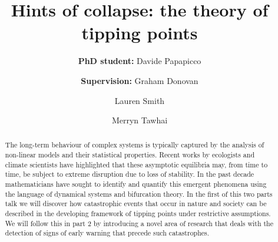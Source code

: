 \documentclass[dvipsnames, table, 11pt]{article}
\begin{document}
     \title{Hints of collapse: the theory of tipping points}

     \author[*]{\textbf{PhD student:} Davide Papapicco}
     \author[*]{\authorcr \textbf{Supervision:} Graham Donovan}
     \author[*]{Lauren Smith}
     \author[$\dagger$]{Merryn Tawhai}

 
     \date{}

     \maketitle

     \begin{abstract}
             The long-term behaviour of complex systems is typically captured by the analysis of non-linear models and their statistical properties.
             Recent works by ecologists and climate scientists have highlighted that these asymptotic equilibria may, from time to time, be subject to extreme disruption due to loss of stability.
             In the past decade mathematicians have sought to identify and quantify this emergent phenomena using the language of dynamical systems and bifurcation theory.
             In the first of this two parts talk we will discover how catastrophic events that occur in nature and society can be described in the developing framework of tipping points under restrictive assumptions.
             We will follow this in part $2$ by introducing a novel area of research that deals with the detection of signs of early warning that precede such catastrophes.
     \end{abstract}
\end{document}
